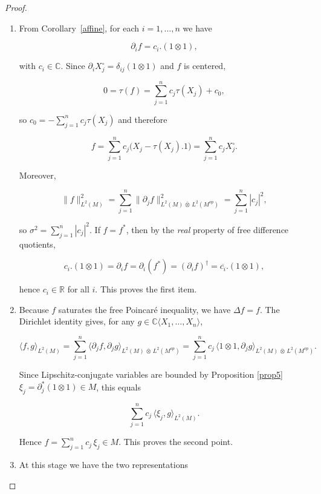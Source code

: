 \documentclass[10pt,a4paper,reqno]{amsart}
\newcommand{\R}{\mathbb{R}}
\newcommand{\C}{\mathbb{C}}
\newcommand{\A}{\mathbb{C}\langle X_1,\dots,X_n\rangle}
\begin{document}
\begin{proof}
\begin{enumerate}

  \item 
  From Corollary~\ref{affine}, for each $i=1,\ldots,n$ we have
  

\[
      \partial_i f = c_i.(1\otimes 1),
  \]


  with $c_i\in\C$. Since $\partial_i X_j^\circ=\delta_{ij}(1\otimes 1)$ and $f$ is centered,
  

\[
      0=\tau(f)=\sum_{j=1}^n c_j\tau(X_j)+c_0,
  \]


  so $c_0=-\sum_{j=1}^n c_j\tau(X_j)$ and therefore
  

\[
      f=\sum_{j=1}^n c_j\big(X_j-\tau(X_j).1\big)=\sum_{j=1}^n c_j X_j^\circ.
  \]



  Moreover,
  

\[
      \|f\|_{L^2(M)}^2
      =\sum_{j=1}^n \|\partial_j f\|_{L^2(M)\,\bar\otimes\,L^2(M^{op})}^2
      =\sum_{j=1}^n |c_j|^2,
  \]


  so $\sigma^2=\sum_{j=1}^n |c_j|^2$.  
  If $f=f^\ast$, then by the \emph{real} property of free difference quotients,
  

\[
      c_i.(1\otimes 1)=\partial_i f=\partial_i(f^\ast)
      =(\partial_i f)^\dagger=\overline{c_i}.(1\otimes 1),
  \]


  hence $c_i\in\R$ for all $i$.  
  This proves the first item.

  \item 
  Because $f$ saturates the free Poincaré inequality, we have $\Delta f=f$.  
  The Dirichlet identity gives, for any $g\in\A$,
  

\[
      \langle f,g\rangle_{L^2(M)}
      =\sum_{j=1}^n 
      \langle \partial_j f,\partial_j g\rangle_{L^2(M)\,\bar\otimes\,L^2(M^{op})}
      =\sum_{j=1}^n c_j\,\langle 1\otimes 1,\partial_j g\rangle_{L^2(M)\,\bar\otimes\,L^2(M^{op})}.
  \]


  Since Lipschitz-conjugate variables are bounded by Proposition \ref{prop5} $\xi_j=\partial_j^\ast(1\otimes 1)\in M$, this equals
  

\[
      \sum_{j=1}^n c_j\,\langle \xi_j,g\rangle_{L^2(M)}.
  \]


  Hence $f=\sum_{j=1}^n c_j\,\xi_j \in M$.  
  This proves the second point.

  \item 
  At this stage we have the two representations
  


\end{enumerate}
\end{proof}
\end{document}
